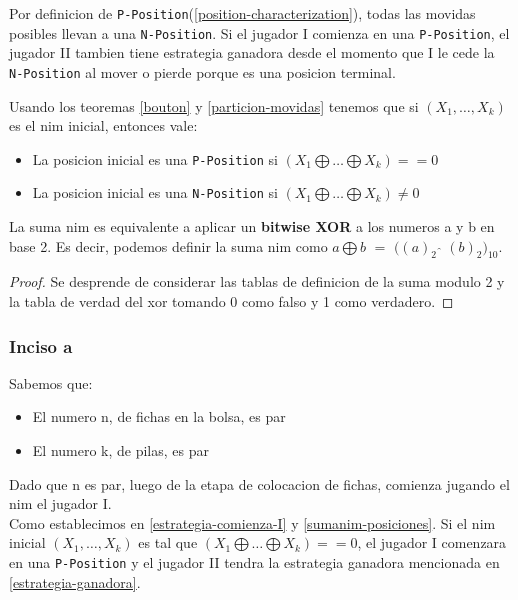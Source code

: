 \begin{corollary}
	\label{estrategia-comienza-I}
	Por definicion de \texttt{P-Position}(\ref{position-characterization}), todas las movidas posibles llevan a una \texttt{N-Position}. Si el jugador I comienza en una \texttt{P-Position}, el jugador II tambien tiene estrategia ganadora desde el momento que I le cede la \texttt{N-Position} al mover o pierde porque es una posicion terminal.
\end{corollary}

\begin{corollary}
	\label{sumanim-posiciones}
	Usando los teoremas \ref{bouton} y \ref{particion-movidas} tenemos que si $(X_1, \dots, X_k)$ es el nim inicial, entonces vale:
	\begin{itemize}
		\item La posicion inicial es una \texttt{P-Position} si $(X_1 \bigoplus \dots \bigoplus X_k) == 0$ 
		\item La posicion inicial es una \texttt{N-Position} si $(X_1 \bigoplus \dots \bigoplus X_k) \neq 0$ 
	\end{itemize}
\end{corollary}

\begin{theorem}
\label{equiv-nim-xor}
	La suma nim es equivalente a aplicar un \textbf{bitwise XOR} a los numeros a y b en base 2. Es decir, podemos definir la suma nim como $a \bigoplus b$ $ = $ $( (a)_2$ $\hat{}$ $(b)_2 )_{10}$.
\end{theorem}
\begin{proof}
	 Se desprende de considerar las tablas de definicion de la suma modulo 2 y la tabla de verdad del xor tomando 0 como falso y 1 como verdadero.
\end{proof}

\subsubsection{Inciso a}
Sabemos que:
\begin{itemize}
	\item El numero n, de fichas en la bolsa, es par
	\item El numero k, de pilas, es par 
\end{itemize}

Dado que n es par, luego de la etapa de colocacion de fichas, comienza jugando el nim el jugador I.\\
Como establecimos en \ref{estrategia-comienza-I} y \ref{sumanim-posiciones}. Si el nim inicial $(X_1, \dots, X_k)$ es tal que $(X_1 \bigoplus \dots \bigoplus X_k) == 0$, el jugador I comenzara en una \texttt{P-Position} y el jugador II tendra la estrategia ganadora mencionada en \ref{estrategia-ganadora}.\\

